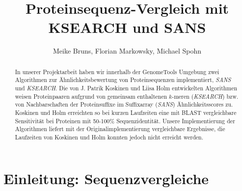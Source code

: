 \documentclass{article}
\title{Proteinsequenz-Vergleich mit KSEARCH und SANS}
\author{Meike Bruns, Florian Markowsky, Michael Spohn}
\begin{document}
\maketitle
\thispagestyle{empty}
\begin{abstract}
In unserer Projektarbeit haben wir innerhalb der GenomeTools Umgebung  zwei Algorithmen zur Ähnlichkeitsbewertung von Proteinsequenzen implementiert, \emph{SANS} und \emph{KSEARCH}. 
Die von J. Patrik Koskinen und Liisa Holm entwickelten Algorithmen weisen Proteinpaaren aufgrund von gemeinsam enthaltenen $k$-meren (\emph{KSEARCH}) bzw. von Nachbarschaften der 
Proteinsuffixe im Suffixarray (\emph{SANS}) Ähn\-lichkeitsscores zu. Koskinen und Holm erreichten so bei kurzen Laufzeiten eine mit BLAST vergleichbare Sensitivität bei 
Proteinen mit 50-100\% Sequenzidentität. Unsere Implementierung der Algorithmen liefert mit der Originalimplementierung vergleichbare Ergebnisse, die Laufzeiten von Koskinen und 
Holm konnten jedoch nicht erreicht werden.
\end{abstract}
\newpage

\tableofcontents
\thispagestyle{empty}
\newpage

\section{Einleitung: Sequenzvergleiche}
\end{document}
